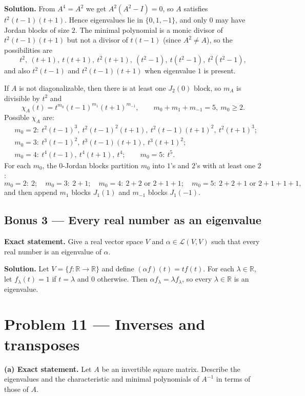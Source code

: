 \documentclass[12pt,a4paper]{article}
\theoremstyle{plain}
\theoremstyle{definition}      %
\begin{document}
\textbf{Solution.}
From $A^4=A^2$ we get $A^2(A^2-I)=0$, so $A$ satisfies $t^2(t-1)(t+1)$.
Hence eigenvalues lie in $\{0,1,-1\}$, and only $0$ may have Jordan blocks of size $2$.
The minimal polynomial is a monic divisor of $t^2(t-1)(t+1)$ but not a divisor of $t(t-1)$ (since $A^2\neq A$), so the possibilities are
\[
t^2,\ (t+1),\ t(t+1),\ t^2(t+1),\ (t^2-1),\ t(t^2-1),\ t^2(t^2-1),
\]
and also $t^2(t-1)$ and $t^2(t-1)(t+1)$ when eigenvalue $1$ is present.

If $A$ is not diagonalizable, then there is at least one $J_2(0)$ block, so $m_A$ is divisible by $t^2$ and
\[
\chi_A(t)=t^{m_0}(t-1)^{m_1}(t+1)^{m_{-1}},\qquad m_0+m_1+m_{-1}=5,\ m_0\ge 2.
\]
Possible $\chi_A$ are:
\[
\begin{aligned}
	&m_0=2:\ t^2(t-1)^3,\ t^2(t-1)^2(t+1),\ t^2(t-1)(t+1)^2,\ t^2(t+1)^3;\\
	&m_0=3:\ t^3(t-1)^2,\ t^3(t-1)(t+1),\ t^3(t+1)^2;\\
	&m_0=4:\ t^4(t-1),\ t^4(t+1),\ t^4;\qquad
	m_0=5:\ t^5.
\end{aligned}
\]
For each $m_0$, the $0$-Jordan blocks partition $m_0$ into $1$'s and $2$'s with at least one $2$:
\[
m_0=2:\ 2;\quad
m_0=3:\ 2+1;\quad
m_0=4:\ 2+2 \text{ or } 2+1+1;\quad
m_0=5:\ 2+2+1 \text{ or } 2+1+1+1,
\]
and then append $m_1$ blocks $J_1(1)$ and $m_{-1}$ blocks $J_1(-1)$.

\subsection*{Bonus 3 — Every real number as an eigenvalue}

\textbf{Exact statement.}
Give a real vector space $V$ and $\alpha\in\mathcal L(V,V)$ such that every real number is an eigenvalue of $\alpha$.

\textbf{Solution.}
Let $V=\{f:\mathbb R\to\mathbb R\}$ and define $(\alpha f)(t)=t f(t)$.
For each $\lambda\in\mathbb R$, let $f_\lambda(t)=1$ if $t=\lambda$ and $0$ otherwise.
Then $\alpha f_\lambda=\lambda f_\lambda$, so every $\lambda\in\mathbb R$ is an eigenvalue.


\section*{Problem 11 — Inverses and transposes}

\textbf{(a) Exact statement.}
Let $A$ be an invertible square matrix. Describe the eigenvalues and the characteristic and minimal polynomials of $A^{-1}$ in terms of those of $A$.
\end{document}
